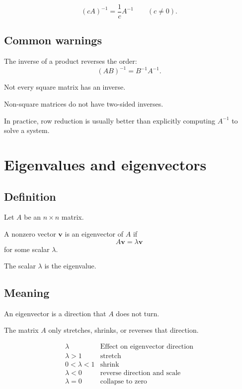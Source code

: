 \[
\boxed{
    (cA)^{-1}=\frac1c A^{-1}
    \qquad (c\ne0).
}
\]

\subsection*{Common warnings}

The inverse of a product reverses the order:
\[
    (AB)^{-1}=B^{-1}A^{-1}.
\]

Not every square matrix has an inverse.

Non-square matrices do not have two-sided inverses.

In practice, row reduction is usually better than explicitly computing \(A^{-1}\) to solve
a system.

\section{Eigenvalues and eigenvectors}
\label{app:C.5}

\subsection*{Definition}

Let \(A\) be an \(n\times n\) matrix.

A nonzero vector \(\mathbf v\) is an eigenvector of \(A\) if
\[
\boxed{
    A\mathbf v=\lambda \mathbf v
}
\]
for some scalar \(\lambda\).

The scalar \(\lambda\) is the eigenvalue.

\subsection*{Meaning}

An eigenvector is a direction that \(A\) does not turn.

The matrix \(A\) only stretches, shrinks, or reverses that direction.

\[
\begin{array}{c|c}
\lambda & \text{Effect on eigenvector direction} \\ \hline
\lambda>1 & \text{stretch}\\
0<\lambda<1 & \text{shrink}\\
\lambda<0 & \text{reverse direction and scale}\\
\lambda=0 & \text{collapse to zero}
\end{array}
\]

